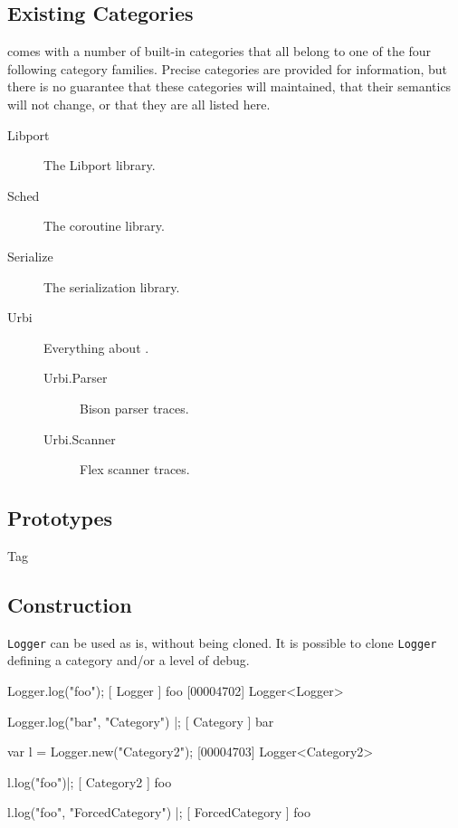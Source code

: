 \subsection{Existing Categories}
\label{sec:logger:categories}
\usdk comes with a number of built-in categories that all belong to one of
the four following category families.  Precise categories are provided for
information, but there is no guarantee that these categories will
maintained, that their semantics will not change, or that they are all
listed here.

\begin{description}
\item[Libport] The Libport library.
\item[Sched] The coroutine library.
\item[Serialize] The serialization library.
\item[Urbi] Everything about \usdk.
  \begin{description}
  \item[Urbi.Parser] Bison parser traces.
  \item[Urbi.Scanner] Flex scanner traces.
  \end{description}
\end{description}


\subsection{Prototypes}
\begin{refObjects}
\item[Tag]
\end{refObjects}

\subsection{Construction}

\lstinline|Logger| can be used as is, without being cloned. It is possible
to clone \lstinline|Logger| defining a category and/or a level of debug.

\begin{urbiscript}
Logger.log("foo");
[        Logger         ] foo
[00004702] Logger<Logger>

Logger.log("bar", "Category") |;
[       Category        ] bar

var l = Logger.new("Category2");
[00004703] Logger<Category2>

l.log("foo")|;
[       Category2       ] foo

l.log("foo", "ForcedCategory") |;
[    ForcedCategory     ] foo
\end{urbiscript}

